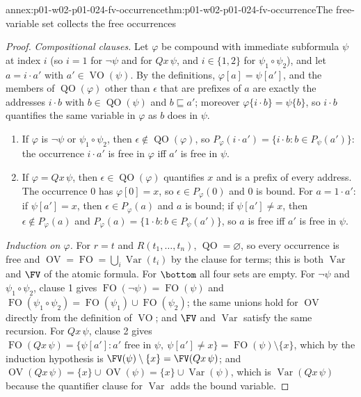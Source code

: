 \begin{annexitem}{annex:p01-w02-p01-024-fv-occurrence}{thm:p01-w02-p01-024-fv-occurrence}{The free-variable set collects the free occurrences}
\begin{proof}
\emph{Compositional clauses.}  Let \(\varphi\) be compound with immediate
subformula \(\psi\) at index \(i\) (so \(i=1\) for \(\neg\psi\) and for
\(Qx\,\psi\), and \(i\in\{1,2\}\) for \(\psi_1\circ\psi_2\)), and let
\(a=i\cdot a'\) with \(a'\in\operatorname{VO}(\psi)\).  By the definitions,
\(\varphi[a]=\psi[a']\), and the members of \(\operatorname{QO}(\varphi)\)
other than \(\epsilon\) that are prefixes of \(a\) are exactly the addresses
\(i\cdot b\) with \(b\in\operatorname{QO}(\psi)\) and \(b\sqsubseteq a'\);
moreover \(\varphi\{i\cdot b\}=\psi\{b\}\), so \(i\cdot b\) quantifies the
same variable in \(\varphi\) as \(b\) does in \(\psi\).
\begin{enumerate}
\item If \(\varphi\) is \(\neg\psi\) or \(\psi_1\circ\psi_2\), then
  \(\epsilon\notin\operatorname{QO}(\varphi)\), so
  \(P_\varphi(i\cdot a')=\{i\cdot b:b\in P_\psi(a')\}\): the occurrence
  \(i\cdot a'\) is free in \(\varphi\) iff \(a'\) is free in \(\psi\).
\item If \(\varphi=Qx\,\psi\), then \(\epsilon\in\operatorname{QO}(\varphi)\)
  quantifies \(x\) and is a prefix of every address.  The occurrence \(0\)
  has \(\varphi[0]=x\), so \(\epsilon\in P_\varphi(0)\) and \(0\) is bound.
  For \(a=1\cdot a'\): if \(\psi[a']=x\), then \(\epsilon\in P_\varphi(a)\)
  and \(a\) is bound; if \(\psi[a']\neq x\), then \(\epsilon\notin
  P_\varphi(a)\) and \(P_\varphi(a)=\{1\cdot b:b\in P_\psi(a')\}\), so
  \(a\) is free iff \(a'\) is free in \(\psi\).
\end{enumerate}

\emph{Induction on \(\varphi\).}  For \(r=t\) and \(R(t_1,\ldots,t_n)\),
\(\operatorname{QO}=\varnothing\), so every occurrence is free and
\(\operatorname{OV}=\operatorname{FO}=\bigcup_i\operatorname{Var}(t_i)\) by
the clause for terms; this is both \(\operatorname{Var}\) and \(\FV\) of the
atomic formula.  For \(\bottom\) all four sets are empty.  For \(\neg\psi\)
and \(\psi_1\circ\psi_2\), clause 1 gives
\(\operatorname{FO}(\neg\psi)=\operatorname{FO}(\psi)\) and
\(\operatorname{FO}(\psi_1\circ\psi_2)=\operatorname{FO}(\psi_1)\cup
\operatorname{FO}(\psi_2)\); the same unions hold for
\(\operatorname{OV}\) directly from the definition of
\(\operatorname{VO}\); and \(\FV\) and \(\operatorname{Var}\) satisfy the
same recursion.  For \(Qx\,\psi\), clause 2 gives
\(\operatorname{FO}(Qx\,\psi)=\{\psi[a']:a'\text{ free in }\psi,\
\psi[a']\neq x\}=\operatorname{FO}(\psi)\setminus\{x\}\), which by the
induction hypothesis is \(\FV(\psi)\setminus\{x\}=\FV(Qx\,\psi)\); and
\(\operatorname{OV}(Qx\,\psi)=\{x\}\cup\operatorname{OV}(\psi)=\{x\}\cup
\operatorname{Var}(\psi)\), which is \(\operatorname{Var}(Qx\,\psi)\)
because the quantifier clause for \(\operatorname{Var}\) adds the bound
variable.


\end{proof}
\end{annexitem}
